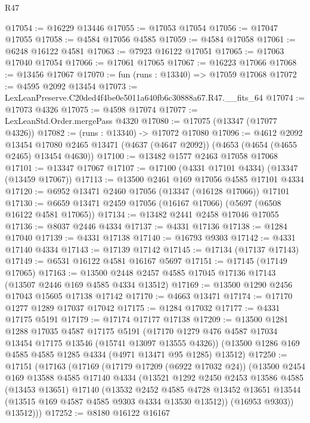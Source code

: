 \begin{lexlean}{R47}
\begin{coremodule}
@17054 := @16229 @13446
@17055 := @17053 @17054
@17056 := @17047 @17055
@17058 := @4584 @17056 @4585
@17059 := @4584 @17058
@17061 := @6248 @16122 @4581
@17063 := @7923 @16122 @17051
@17065 := @17063 @17040 @17054
@17066 := @17061 @17065
@17067 := @16223 @17066
@17068 := @13456 @17067
@17070 := fun (runs : @13340) => @17059 @17068
@17072 := @4595 @2092 @13454
@17073 := LexLeanPreserve.C20ded4f4be0e5011a640fb6c30888a67.R47.__fits_64
@17074 := @17073 @4326
@17075 := @4598 @17074
@17077 := LexLeanStd.Order.mergePass @4320
@17080 := @17075 (@13347 (@17077 @4326))
@17082 := (runs : @13340) -> @17072 @17080
@17096 := @4612
    @2092
    @13454
    @17080
    @2465
    @13471
    (@4637 (@4647 @2092))
    (@4653 (@4654 (@4655 @2465) @13454 @4630))
@17100 := @13482 @1577 @2463 @17058 @17068
@17101 := @13347 @17067
@17107 := @17100 (@4331 @17101 @4334) (@13347 (@13459 @17067))
@17113 := @13500 @2461 @169 @17056 @4585 @17101 @4334
@17120 := @6952 @13471 @2460 @17056 (@13347 (@16128 @17066)) @17101
@17130 := @6659 @13471 @2459 @17056 (@16167 @17066) (@5697 (@6508 @16122 @4581 @17065))
@17134 := @13482 @2441 @2458 @17046 @17055
@17136 := @8037 @2446 @4334
@17137 := @4331 @17136
@17138 := @1284 @17040
@17139 := @4331 @17138
@17140 := @16793 @9303
@17142 := @4331 @17140 @4334
@17143 := @17139 @17142
@17145 := @17134 (@17137 @17143)
@17149 := @6531 @16122 @4581 @16167 @5697
@17151 := @17145 (@17149 @17065)
@17163 := @13500 @2448 @2457 @4585 @17045 @17136 @17143 (@13507 @2446 @169 @4585 @4334 @13512)
@17169 := @13500 @1290 @2456 @17043 @15605 @17138 @17142
@17170 := @4663 @13471
@17174 := @17170 @1277 @1289 @17037 @17042
@17175 := @1284 @17032
@17177 := @4331 @17175 @5191
@17179 := @17174 @17177 @17138
@17209 := @13500
    @1281
    @1288
    @17035
    @4587
    @17175
    @5191
    (@17170 @1279 @476 @4587 @17034 @13454 @17175 @13546 (@15741 @13097 @13555 @4326))
    (@13500 @1286 @169 @4585 @4585 @1285 @4334 (@4971 @13471 @95 @1285) @13512)
@17250 := @17151
    (@17163
      (@17169
        (@17179 @17209 (@6922 @17032 @24))
        (@13500
          @2454
          @169
          @13588
          @4585
          @17140
          @4334
          (@13521
            @1292
            @2450
            @2453
            @13586
            @4585
            (@13453 @13651)
            @17140
            (@13532
              @2452
              @4585
              @4728
              @13452
              @13651
              @13544
              (@13515 @169 @4587 @4585 @9303 @4334 @13530 @13512))
            (@16953 @9303))
          @13512)))
@17252 := @8180 @16122 @16167

\end{coremodule}
\end{lexlean}
